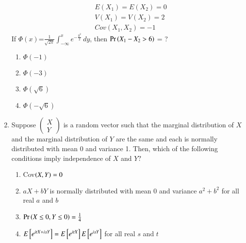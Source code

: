 \begin{enumerate}[label=\thesection.\arabic*.,ref=\thesection.\theenumi]
\begin{align}
    &E(X_1)=E(X_2)=0\\
    &V(X_1)=V(X_2)=2\\
    &Cov(X_1,X_2)=-1
\end{align}
If $\Phi(x)$=$\frac{1}{ \sqrt{2\pi}}\int_{-\infty}^{x}e^{-\frac{{y}^2}{2}}\, dy$, then $\Pr\left(X_1-X_2>6\right)$ = ?
\begin{enumerate}
    \item $\Phi(-1)$
    \item $\Phi(-3)$
    \item $\Phi(\sqrt{6})$
    \item $\Phi(-\sqrt{6})$
\end{enumerate}
\solution



\item Suppose
$\begin{pmatrix}
X\\
Y
\end{pmatrix}$ is a random vector such that the marginal distribution of $X$ and the marginal distribution of $Y$ are the same and each is normally distributed with mean 0 and variance 1. Then, which of the following conditions imply independence of $X$ and $Y?$
\begin{enumerate}
\item Cov$\left(X,Y\right)=0$
\item $aX+bY$ is normally distributed with mean 0 and variance $a^2+b^2$ for all real $a$ and $b$
\item $\Pr\left(X\le 0, Y\le 0\right)=\frac{1}{4}$
\item $E{}\left[e^{itX+isY}\right]=E{}\left[e^{itX}\right]E{}\left[e^{isY}\right]$ for all real $s$ and $t$
\end{enumerate}
%
\solution


\end{enumerate}